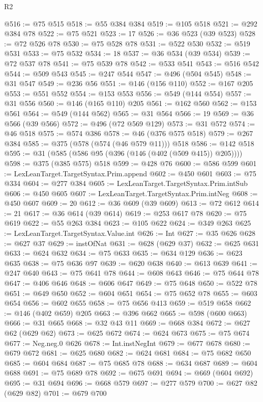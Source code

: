 \begin{lexlean}{R2}
\begin{coremodule}
{{{{{{{{{{{{{{{{{{{{{{{{{{{{{{{{{{{{{{{{{{{@516 := @75 @515
@518 := @55 @384 @384
@519 := @105 @518
@521 := @292 @384 @78
@522 := @75 @521
@523 := 17
@526 := @36 @523 (@39 @523)
@528 := @72 @526 @78
@530 := @75 @528 @78
@531 := @522 @530
@532 := @519 @531
@533 := @75 @532
@534 := 18
@537 := @36 @534 (@39 @534)
@539 := @72 @537 @78
@541 := @75 @539 @78
@542 := @533 @541
@543 := @516 @542
@544 := @509 @543
@545 := @247 @544
@547 := @496 (@504 @545)
@548 := @31 @547
@549 := @236 @56
@551 := @146 (@156 @110)
@552 := @167 @205
@553 := @551 @552
@554 := @153 @553
@556 := @549 (@144 @554)
@557 := @31 @556
@560 := @146 (@165 @110) @205
@561 := @162 @560
@562 := @153 @561
@564 := @549 (@144 @562)
@565 := @31 @564
@566 := 19
@569 := @36 @566 (@39 @566)
@572 := @496 (@72 @569 @129)
@573 := @31 @572
@574 := @46 @518
@575 := @574 @386
@578 := @46 (@376 @575 @518)
@579 := @267 @384
@585 := @375 (@578 (@574 (@46 @579 @11))) @518
@586 := @142 @518
@595 := @31 (@585 (@586 @95 (@396 (@146 (@402 (@509 @415)) @205))))
@598 := @375 (@385 @575) @518
@599 := @428 @76
@600 := @586 @599
@601 := LexLeanTarget.TargetSyntax.Prim.append
@602 := @450 @601
@603 := @75 @334
@604 := @277 @384
@605 := LexLeanTarget.TargetSyntax.Prim.intSub
@606 := @450 @605
@607 := LexLeanTarget.TargetSyntax.Prim.intNeg
@608 := @450 @607
@609 := 20
@612 := @36 @609 (@39 @609)
@613 := @72 @612
@614 := 21
@617 := @36 @614 (@39 @614)
@619 := @253 @617 @78
@620 := @75 @619
@622 := @55 @263 @384
@623 := @105 @622
@624 := @349 @263
@625 := LexLeanTarget.TargetSyntax.Value.int
@626 := Int
@627 := @35 @626
@628 := @627 @37
@629 := instOfNat
@631 := @628 (@629 @37)
@632 := @625 @631
@633 := @624 @632
@634 := @75 @633
@635 := @634 @129
@636 := @623 @635
@638 := @75 @636 @97
@639 := @620 @638
@640 := @613 @639
@641 := @247 @640
@643 := @75 @641 @78
@644 := @608 @643
@646 := @75 @644 @78
@647 := @406 @646
@648 := @606 @647
@649 := @75 @648
@650 := @522 @78
@651 := @649 @650
@652 := @604 @651
@654 := @75 @652 @78
@655 := @603 @654
@656 := @602 @655
@658 := @75 @656 @413
@659 := @519 @658
@662 := @146 (@402 @659) @205
@663 := @396 @662
@665 := @598 (@600 @663)
@666 := @31 @665
@668 := @32 @43 @11
@669 := @668 @384
@672 := @627 @62 (@629 @62)
@673 := @625 @672
@674 := @624 @673
@675 := @75 @674
@677 := Neg.neg.{0} @626
@678 := Int.instNegInt
@679 := @677 @678
@680 := @679 @672
@681 := @625 @680
@682 := @624 @681
@684 := @75 @682 @650
@685 := @604 @684
@687 := @75 @685 @78
@688 := @634 @687
@689 := @604 @688
@691 := @75 @689 @78
@692 := @675 @691
@694 := @669 (@604 @692)
@695 := @31 @694
@696 := @668 @579
@697 := @277 @579
@700 := @627 @82 (@629 @82)
@701 := @679 @700
}}}}}}}}}}}}}}}}}}}}}}}}}}}}}}}}}}}}}}}}}}}
\end{coremodule}
\end{lexlean}
